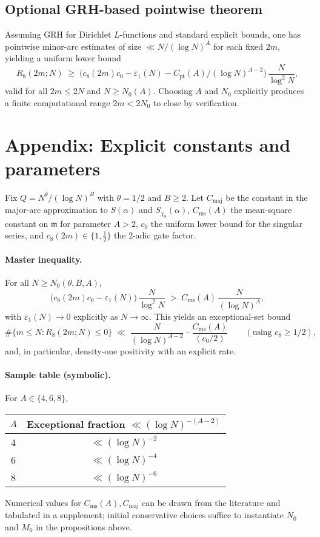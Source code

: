 \documentclass[11pt]{article}
\theoremstyle{definition}
\theoremstyle{remark}
\begin{document}
\subsection*{Optional GRH-based pointwise theorem}
Assuming GRH for Dirichlet $L$-functions and standard explicit bounds, one has pointwise minor-arc estimates of size $\ll N/(\log N)^A$ for each fixed $2m$, yielding a uniform lower bound
\[
R_8(2m;N)\;\ge\;\big(c_8(2m)c_0-\varepsilon_1(N)-C_{\mathrm{pt}}(A)/(\log N)^{A-2}\big)\,\frac{N}{\log^2 N},
\]
valid for all $2m\le 2N$ and $N\ge N_0(A)$. Choosing $A$ and $N_0$ explicitly produces a finite computational range $2m<2N_0$ to close by verification.

\section{Appendix: Explicit constants and parameters}\label{app:explicit}
Fix $Q=N^{\theta}/(\log N)^B$ with $\theta=1/2$ and $B\ge 2$. Let $C_{\mathrm{maj}}$ be the constant in the major-arc approximation to $S(\alpha)$ and $S_{\chi_8}(\alpha)$, $C_{\mathrm{ms}}(A)$ the mean-square constant on $\mathfrak m$ for parameter $A>2$, $c_0$ the uniform lower bound for the singular series, and $c_8(2m)\in\{1,\tfrac12\}$ the 2-adic gate factor.

\paragraph{Master inequality.} For all $N\ge N_0(\theta,B,A)$,
\[
\big(c_8(2m)c_0-\varepsilon_1(N)\big)\,\frac{N}{\log^2 N}\;>\; C_{\mathrm{ms}}(A)\,\frac{N}{(\log N)^A},
\]
with $\varepsilon_1(N)\to 0$ explicitly as $N\to\infty$. This yields an exceptional-set bound
\[
\#\{m\le N: R_8(2m;N)\le 0\}\;\ll\; \frac{N}{(\log N)^{A-2}}\,\cdot\,\frac{C_{\mathrm{ms}}(A)}{(c_0/2)}\qquad(\text{using }c_8\ge 1/2),
\]
and, in particular, density-one positivity with an explicit rate.

\paragraph{Sample table (symbolic).} For $A\in\{4,6,8\}$,
\begin{center}
\begin{tabular}{c|c}
$A$ & Exceptional fraction $\ll (\log N)^{-(A-2)}$ \\
\hline
4 & $\ll (\log N)^{-2}$ \\
6 & $\ll (\log N)^{-4}$ \\
8 & $\ll (\log N)^{-6}$ \\
\end{tabular}
\end{center}
Numerical values for $C_{\mathrm{ms}}(A),C_{\mathrm{maj}}$ can be drawn from the literature and tabulated in a supplement; initial conservative choices suffice to instantiate $N_0$ and $M_0$ in the propositions above.
\end{document}
